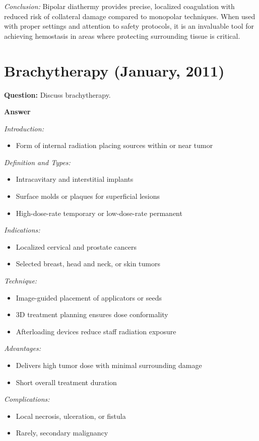 \documentclass{article}
\begin{document}
\emph{Conclusion:} Bipolar diathermy provides precise, localized coagulation with reduced risk of collateral damage compared to monopolar techniques. When used with proper settings and attention to safety protocols, it is an invaluable tool for achieving hemostasis in areas where protecting surrounding tissue is critical.

\section{Brachytherapy (January, 2011)}

\textbf{Question:} Discuss brachytherapy.

\textbf{Answer}

\emph{Introduction:}
\begin{itemize}
\item Form of internal radiation placing sources within or near tumor
\end{itemize}
\emph{Definition and Types:}
\begin{itemize}
\item Intracavitary and interstitial implants
\item Surface molds or plaques for superficial lesions
\item High-dose-rate temporary or low-dose-rate permanent
\end{itemize}
\emph{Indications:}
\begin{itemize}
\item Localized cervical and prostate cancers
\item Selected breast, head and neck, or skin tumors
\end{itemize}
\emph{Technique:}
\begin{itemize}
\item Image-guided placement of applicators or seeds
\item 3D treatment planning ensures dose conformality
\item Afterloading devices reduce staff radiation exposure
\end{itemize}
\emph{Advantages:}
\begin{itemize}
\item Delivers high tumor dose with minimal surrounding damage
\item Short overall treatment duration
\end{itemize}
\emph{Complications:}
\begin{itemize}
\item Local necrosis, ulceration, or fistula
\item Rarely, secondary malignancy
\end{itemize}
\end{document}
